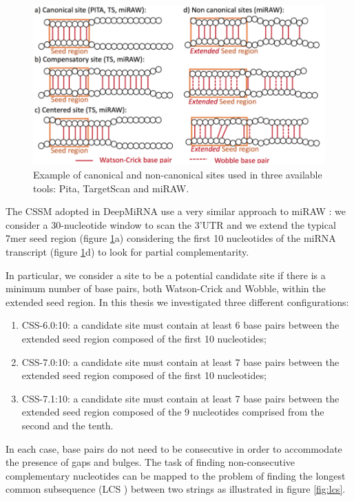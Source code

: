 \begin{figure}[hbt!]
	\centering
	\includegraphics[width=1\textwidth]{Figures/canonical}
	\caption{Example of canonical and non-canonical sites used in three available tools: Pita, TargetScan and miRAW.}
	\label{fig:canonical}
\end{figure}

The CSSM adopted in DeepMiRNA use a very similar approach to miRAW \cite{miraw}: we consider a 30-nucleotide window to scan the 3'UTR and we extend the typical 7mer seed region (figure \ref{fig:canonical}a) considering the first 10 nucleotides of the miRNA transcript (figure \ref{fig:canonical}d) to look for partial complementarity.

In particular, we consider a site to be a potential candidate site if there is a minimum number of base pairs, both Watson-Crick and Wobble, within the extended seed region. In this thesis we investigated three different configurations: 

\begin{enumerate}
	\item CSS-6.0:10: a candidate site must contain at least 6 base pairs between the extended seed region composed of the first 10 nucleotides;
	\item CSS-7.0:10: a candidate site must contain at least 7 base pairs between the extended seed region composed of the first 10 nucleotides;
	\item CSS-7.1:10: a candidate site must contain at least 7 base pairs between the extended seed region composed of the 9 nucleotides comprised from the second and the tenth. 
	
\end{enumerate}

In each case, base pairs do not need to be consecutive in order to accommodate the presence of gaps and bulges. The task of finding non-consecutive complementary nucleotides can be mapped to the problem of finding the longest common subsequence (LCS ) between two strings as illustrated in figure \ref{fig:lcs}.

